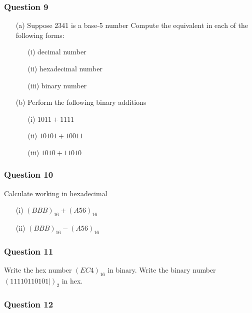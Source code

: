 \documentclass[]{report}
\begin{document}
\begin{enumerate}
\subsubsection*{Question 9}

\begin{itemize}
\item[(a)] Suppose 2341 is a base-5 number
Compute the equivalent in each of the following forms:
\begin{itemize}
\item[(i)] decimal number
\item[(ii)] hexadecimal number
\item[(iii)] binary number
\end{itemize}
\item[(b)] Perform the following binary additions
\begin{itemize}
\item[(i)] $1011+ 1111$
\item[(ii)] $10101  + 10011$
\item[(iii)] $1010 + 11010$
\end{itemize}
\end{itemize}

\subsubsection*{Question 10}

Calculate working in hexadecimal
\begin{itemize}
\item[(i)] $(BBB)_{16} + (A56)_{16}$
\item[(ii)] $(BBB)_{16} - (A56)_{16}$
\end{itemize} 


\subsubsection*{Question 11}

Write the hex number $(EC4)_{16}$ in binary.
Write the binary number $(11110110101|)_2$ in hex.
\subsubsection*{Question 12}


\end{enumerate}
\end{document}
